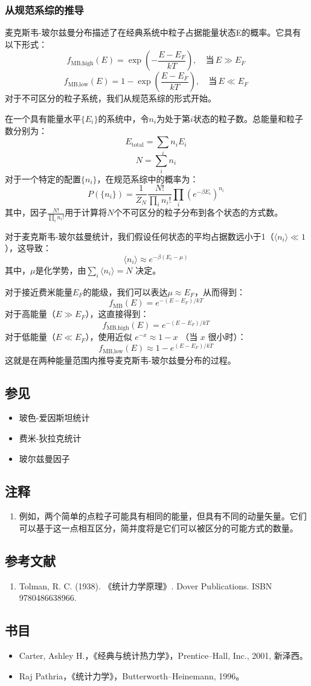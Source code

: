 \subsubsection{从规范系综的推导}
麦克斯韦-玻尔兹曼分布描述了在经典系统中粒子占据能量状态E的概率。它具有以下形式：
\[
f_{\text{MB,high}}(E) = \exp \left( -\frac{E - E_F}{kT} \right), \quad \text{当} \, E \gg E_F~
\]
\[
f_{\text{MB,low}}(E) = 1 - \exp \left( \frac{E - E_F}{kT} \right), \quad \text{当} \, E \ll E_F~
\]
对于不可区分的粒子系统，我们从规范系综的形式开始。

在一个具有能量水平\(\{E_i\}\)的系统中，令\(n_i\)为处于第\(i\)状态的粒子数。总能量和粒子数分别为：
\[
E_{\text{total}} = \sum_i n_i E_i~
\]
\[
N = \sum_i n_i~
\]
对于一个特定的配置\(\{n_i\}\)，在规范系综中的概率为：
\[
P(\{n_i\}) = \frac{1}{Z_N} \frac{N!}{\prod_i n_i!} \prod_i (e^{-\beta E_i})^{n_i}~
\]
其中，因子\(\frac{N!}{\prod_i n_i!}\)用于计算将\(N\)个不可区分的粒子分布到各个状态的方式数。

对于麦克斯韦-玻尔兹曼统计，我们假设任何状态的平均占据数远小于1（\(\langle n_i \rangle \ll 1\)），这导致：
\[
\langle n_i \rangle \approx e^{-\beta (E_i - \mu)}~
\]
其中，\(\mu\)是化学势，由\(\sum_i \langle n_i \rangle = N\) 决定。

对于接近费米能量\(E_F\)的能级，我们可以表达\(\mu \approx E_F\)，从而得到：
\[
f_{\text{MB}}(E) = e^{-(E - E_F) / kT}~
\]
对于高能量（\(E \gg E_F\)），这直接得到：
\[
f_{\text{MB,high}}(E) = e^{-(E - E_F) / kT}~
\]
对于低能量（\(E \ll E_F\)），使用近似 \(e^{-x} \approx 1 - x\) （当 \(x\) 很小时）：
\[
f_{\text{MB,low}}(E) \approx 1 - e^{(E - E_F) / kT}~
\]
这就是在两种能量范围内推导麦克斯韦-玻尔兹曼分布的过程。
\subsection{参见}
\begin{itemize}
\item 玻色-爱因斯坦统计
\item 费米-狄拉克统计
\item 玻尔兹曼因子
\end{itemize}

\subsection{注释}
\begin{enumerate}
\item 例如，两个简单的点粒子可能具有相同的能量，但具有不同的动量矢量。它们可以基于这一点相互区分，简并度将是它们可以被区分的可能方式的数量。
\end{enumerate}
\subsection{参考文献}
\begin{enumerate}
\item Tolman, R. C. (1938). 《统计力学原理》. Dover Publications. ISBN 9780486638966.
\end{enumerate}
\subsection{书目}
\begin{itemize}
\item Carter, Ashley H.，《经典与统计热力学》，Prentice–Hall, Inc., 2001, 新泽西。
\item Raj Pathria，《统计力学》，Butterworth–Heinemann, 1996。
\end{itemize}